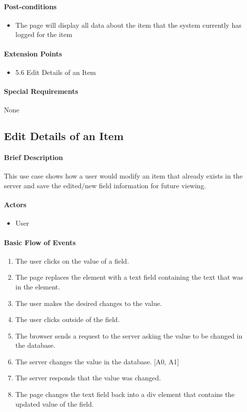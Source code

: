 \documentclass{article}
\begin{document}
\paragraph{Post-conditions}
\begin{itemize}
\item The page will display all data about the item that the system currently has logged for the item
\end{itemize}

\paragraph{Extension Points}
\begin{itemize}
\item 5.6 Edit Details of an Item
\end{itemize}

\paragraph{Special Requirements}
None

\subsection{Edit Details of an Item}

\paragraph{Brief Description}
This use case shows how a user would modify an item that already exists in the server and save the edited/new field information for future viewing.

\paragraph{Actors}
\begin{itemize}
\item User
\end{itemize}

\paragraph{Basic Flow of Events}
\begin{enumerate}
\item The user clicks on the value of a field.
\item The page replaces the element with a text field containing the text that was in the element.
\item The user makes the desired changes to the value.
\item The user clicks outside of the field.
\item The browser sends a request to the server asking the value to be changed in the database.
\item The server changes the value in the database. [A0, A1]
\item The server responds that the value was changed.
\item The page changes the text field back into a div element that contains the updated value of the field.
\end{enumerate}
\end{document}
